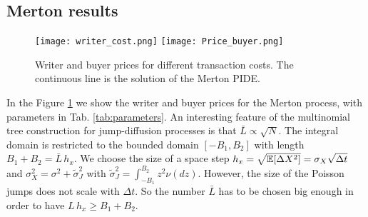 \subsection{Merton results}

\begin{figure}[t!]
   \centering
   \texttt{[image: writer\_cost.png]}
   \texttt{[image: Price\_buyer.png]}
   \caption{Writer and buyer prices for different transaction costs. The continuous line is the solution of the Merton PIDE.}
   \label{Fig3}
\end{figure}
In the Figure \ref{Fig3} we show the writer and buyer prices for the Merton process, with parameters in Tab. \ref{tab:parameters}.
An interesting feature of the multinomial tree construction for jump-diffusion processes is that $\bar L \propto \sqrt{N}$.
The integral domain is restricted to the bounded domain $[-B_1,B_2]$ with length $B_1+B_2 = \bar L \, h_x$. 
We choose the size of a space step $h_x = \sqrt{\mathbb{E}[\Delta X^2]} = \sigma_X \sqrt{\Delta t}$ and $\sigma_X^2 = \sigma^2 + \tilde \sigma_J^2$ 
with $ \tilde \sigma_J^2 = \int_{-B_1}^{B_2} z^2 \nu(dz)$.
However, the size of the Poisson jumps does not scale with $\Delta t$. So the number $\bar L$ has to be chosen big enough in order 
to have $L\, h_x \geq B_1+B_2$. 

